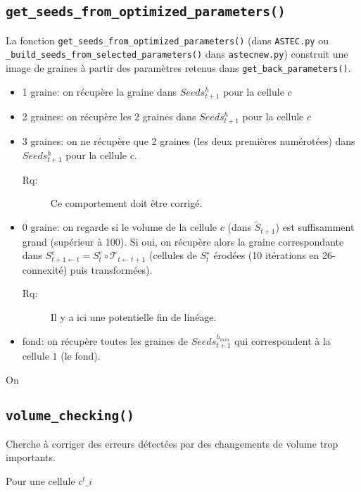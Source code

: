 \documentclass{article}
\newenvironment{remarque}{\color{red}\begin{description}\item[Rq:]}
{\end{description}\color{black}}
\begin{document}
\subsection{\texttt{get\_seeds\_from\_optimized\_parameters()}}

La fonction \verb|get_seeds_from_optimized_parameters()| (dans \verb|ASTEC.py| ou \verb|_build_seeds_from_selected_parameters()| dans \verb|astecnew.py|) construit une image de graines \`a partir des param\`etres retenus dans \verb|get_back_parameters()|.

\begin{itemize}
\item 1 graine: on r\'ecup\`ere la graine dans $Seeds^{h}_{t+1}$ pour la cellule $c$

\item 2 graines: on r\'ecup\`ere les 2 graines dans  $Seeds^{h}_{t+1}$ pour la cellule $c$

\item 3 graines: on ne r\'ecup\`ere que 2 graines (les deux premi\`eres num\'erot\'ees) dans  $Seeds^{h}_{t+1}$ pour la cellule $c$.
\begin{remarque}
Ce comportement doit \^etre corrig\'e.
\end{remarque}

\item 0 graine: on regarde si le volume de la cellule $c$ (dans $\tilde{S}_{t+1}$) est suffisamment grand (sup\'erieur \`a 100). 
Si oui, on r\'ecup\`ere alors la graine correspondante dans $S^e_{t+1 \leftarrow t} = S^e_t \circ \mathcal{T}_{t \leftarrow t+1}$ (cellules de $S^{\star}_t$ \'erod\'ees (10 it\'erations en 26-connexit\'e) puis transform\'ees).
\begin{remarque}
Il y a ici une potentielle fin de lin\'eage.
\end{remarque}

\item fond: on r\'ecup\`ere toutes les graines de $Seeds^{h_{min}}_{t+1}$ qui correspondent \`a la cellule $1$ (le fond). 

\end{itemize}

On 


\subsection{\texttt{volume\_checking()}}

Cherche \`a corriger des erreurs d\'etect\'ees par des changements de volume trop importants.

Pour une cellule $c^{t}\_i$


\cite{guignard:tel-01278725}



\end{document}
